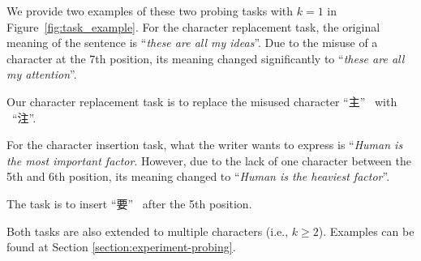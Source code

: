\documentclass[11pt]{article}
\begin{document}
We provide two examples of these two probing tasks with $k=1$ in Figure~\ref{fig:task_example}. 
For the character replacement task, the original meaning of the sentence is ``\textit{these are all my ideas}''. Due to the misuse of a character at the 7th position, its meaning changed significantly to ``\textit{these are all my attention}''.
\begin{CJK*}{UTF8}{gbsn}
Our character replacement task is to replace the misused character ``主'' \ with \ ``注''.
\end{CJK*}
For the character insertion task, what the writer wants to express is ``\textit{Human is the most important factor}. However, due to the lack of one character between the 5th and 6th position, its meaning changed to ``\textit{Human is the heaviest factor}''. 
\begin{CJK*}{UTF8}{gbsn}
The task is to insert ``要'' \ after the 5th position. 
\end{CJK*}
Both tasks are also extended to multiple characters (i.e., $k \geq 2$). Examples can be found at Section \ref{section:experiment-probing}.
\end{document}
